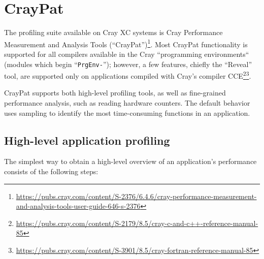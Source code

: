 \section{CrayPat}

The profiling suite available on Cray XC systems is Cray Performance
Measurement and Analysis Tools
(``CrayPat'')\footnote{\url{https://pubs.cray.com/content/S-2376/6.4.6/cray-performance-measurement-and-analysis-tools-user-guide-646-s-2376}}.
Most CrayPat functionality is supported for all compilers available in the Cray
``programming environments`` (modules which begin ``\texttt{PrgEnv-}'');
however, a few features, chiefly the ``Reveal'' tool, are supported only on
applications compiled with Cray's compiler
CCE\footnote{\url{https://pubs.cray.com/content/S-2179/8.5/cray-c-and-c++-reference-manual-85}}\footnote{\url{https://pubs.cray.com/content/S-3901/8.5/cray-fortran-reference-manual-85}}.

CrayPat supports both high-level profiling tools, as well as fine-grained
performance analysis, such as reading hardware counters. The default behavior
uses sampling to identify the most time-consuming functions in an application.

\subsection{High-level application profiling}

The simplest way to obtain a high-level overview of an application's performance consists of the following steps:

